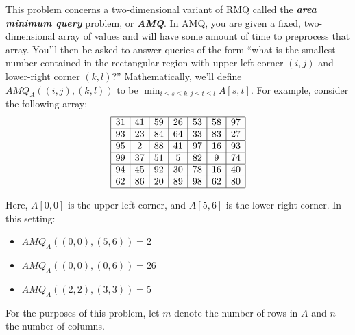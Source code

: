 \documentclass[12pt]{exam}
\newcommand*{\bigo}[1]{O \left( #1 \right)}
\newcommand*{\RMQcomplexity}[2]{\left< #1, #2 \right>}
\begin{document}
\begin{questions}
This problem concerns a two-dimensional variant of RMQ called the \textbf{\emph{area minimum query}} problem, or \textbf{\emph{AMQ}}. In AMQ, you are given a fixed, two-dimensional array of values and will have some amount of time to preprocess that array. You'll then be asked to answer queries of the form ``what is the smallest number contained in the rectangular region with upper-left corner $(i, j)$ and lower-right corner $(k, l)$?'' Mathematically, we'll define $AMQ_A((i, j), (k, l))$ to be $\min_{i \le s \le k, j \le t \le l} A[s, t]$. For example, consider the following array:
\[
\begin{array}{|c|c|c|c|c|c|c|}
\hline
31 & 41 & 59 & 26 & 53 & 58 & 97 \\ \hline
93 & 23 & 84 & 64 & 33 & 83 & 27 \\ \hline
95 &  2 & 88 & 41 & 97 & 16 & 93 \\ \hline
99 & 37 & 51 &  5 & 82 &  9 & 74 \\ \hline
94 & 45 & 92 & 30 & 78 & 16 & 40 \\ \hline
62 & 86 & 20 & 89 & 98 & 62 & 80 \\ \hline
\end{array}
\]

Here, $A[0, 0]$ is the upper-left corner, and $A[5, 6]$ is the lower-right corner. In this setting:
\begin{itemize}
\item $AMQ_A((0, 0), (5, 6)) = 2$
\item $AMQ_A((0, 0), (0, 6)) = 26$
\item $AMQ_A((2, 2), (3, 3)) = 5$
\end{itemize}

For the purposes of this problem, let $m$ denote the number of rows in $A$ and $n$ the number of columns.
\end{questions}
\end{document}
